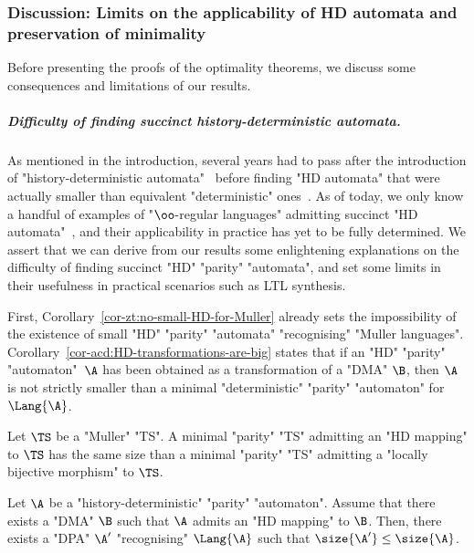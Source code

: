 \documentclass[10pt,a4paper]{amsart}
\begin{document}
\subsubsection{Discussion: Limits on the applicability of HD automata and preservation of minimality}

Before presenting the proofs of the optimality theorems, we discuss some consequences and limitations of our results.


\subparagraph*{Difficulty of finding succinct history-deterministic automata.}
As mentioned in the introduction, several years had to pass after the introduction of "history-deterministic automata"~\cite{HP06}  before finding "HD automata" that were actually smaller than equivalent "deterministic" ones~\cite{KS15DeterminisationGFG}.
As of today, we only know a handful of examples of "$\oo$-regular languages" admitting succinct "HD automata"~\cite{AK22MinimizingGFG, KS15DeterminisationGFG,CCL22SizeGFG}, and their applicability in practice has yet to be fully determined. We assert that we can derive from our results some enlightening explanations on the difficulty of finding succinct "HD" "parity" "automata", and set some limits in their usefulness in practical scenarios such as LTL synthesis.

First, Corollary~\ref{cor-zt:no-small-HD-for-Muller} already sets the impossibility of the existence of small "HD" "parity" "automata" "recognising" "Muller languages". Corollary~\ref{cor-acd:HD-transformations-are-big} states that if an "HD" "parity" "automaton"~$\A$ has been obtained as a transformation of a "DMA" $\B$, then $\A$ is not strictly smaller than a minimal "deterministic" "parity" "automaton" for~$\Lang{\A}$.

\begin{corollary}
	Let $\TS$ be a  "Muller" "TS". A minimal "parity" "TS" admitting an "HD mapping" to $\TS$ has the same size than a minimal "parity" "TS" admitting a "locally bijective morphism" to $\TS$.
\end{corollary}



\begin{corollary}\label{cor-acd:HD-transformations-are-big}
	Let $\A$ be a "history-deterministic" "parity" "automaton". Assume that there exists a "DMA" $\B$ such that $\A$ admits an "HD mapping" to $\B$. Then, there exists a "DPA" $\A'$ "recognising" $\Lang{\A}$ such that $\size{\A'}\leq \size{\A}$.
\end{corollary}
\end{document}
